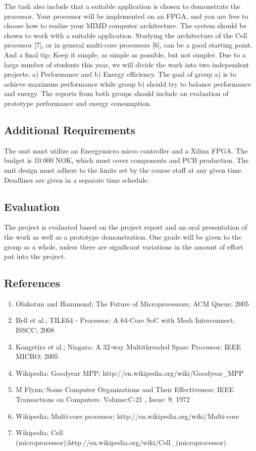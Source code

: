 The task also include that a suitable application is chosen to demonstrate the processor. 
Your processor will be implemented on an FPGA, and you are free to choose how to realize your  
MIMD  computer  architecture.  The system should  be shown to work with  a suitable  application. 
Studying the architecture of the Cell processor [7], or in general multi-core processors [6], can be a 
good starting point. And a final tip; Keep it simple, as simple as possible, but not simpler. 
Due to a large number of students this year, we will divide the work into two independent projects: 
a) Performance and b) Energy efficiency. The goal of group a) is to achieve maximum performance 
while group b) should try to balance performance and energy. The reports from both groups should 
include an evaluation of prototype performance and energy consumption. 

\subsection{Additional Requirements}
The unit must utilize an Energymicro micro controller and a Xilinx FPGA. The budget is 10.000 NOK, 
which must cover components and PCB production. The unit design must adhere to the limits set by 
the course staff at any given time. Deadlines are given in a separate time schedule.

\subsection{Evaluation}
The project is evaluated based on the project report and an oral presentation of the work as well as a 
prototype  demonstration.  One  grade  will  be  given  to  the  group  as  a  whole,  unless  there  are 
significant variations in the amount of effort put into the project.

\subsection{References}

\begin{enumerate}
	\item Olukotun and Hammond; The Future of Microprocessors; ACM Queue; 2005 
\item Bell et al.; TILE64 - Processor: A 64-Core SoC with Mesh Interconnect; ISSCC; 2008  
\item Kongetira et al.; Niagara: A 32-way Multithreaded Sparc Processor; IEEE MICRO; 2005 
\item Wikipedia; Goodyear MPP; http://en.wikipedia.org/wiki/Goodyear\_MPP 
\item M Flynn; Some Computer Organizations and Their Effectiveness; IEEE Transactions on Computers. Volume:C-21 ,  Issue: 9. 1972 
\item Wikipedia; Multi-core processor; http://en.wikipedia.org/wiki/Multi-core 
\item Wikipedia; Cell (microprocessor);http://en.wikipedia.org/wiki/Cell\_(microprocessor) 
\end{enumerate}
